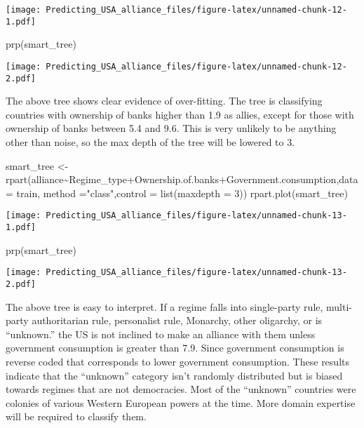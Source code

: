 \documentclass[
]{article}
\newenvironment{Shaded}{\begin{snugshade}}{\end{snugshade}}
\newcommand{\AttributeTok}[1]{\textcolor[rgb]{0.77,0.63,0.00}{#1}}
\newcommand{\DecValTok}[1]{\textcolor[rgb]{0.00,0.00,0.81}{#1}}
\newcommand{\FunctionTok}[1]{\textcolor[rgb]{0.00,0.00,0.00}{#1}}
\newcommand{\NormalTok}[1]{#1}
\newcommand{\OtherTok}[1]{\textcolor[rgb]{0.56,0.35,0.01}{#1}}
\newcommand{\SpecialCharTok}[1]{\textcolor[rgb]{0.00,0.00,0.00}{#1}}
\newcommand{\StringTok}[1]{\textcolor[rgb]{0.31,0.60,0.02}{#1}}
\begin{document}
\texttt{[image: Predicting\_USA\_alliance\_files/figure-latex/unnamed-chunk-12-1.pdf]}

\begin{Shaded}
\begin{Highlighting}[]
\FunctionTok{prp}\NormalTok{(smart\_tree)}
\end{Highlighting}
\end{Shaded}

\texttt{[image: Predicting\_USA\_alliance\_files/figure-latex/unnamed-chunk-12-2.pdf]}

The above tree shows clear evidence of over-fitting. The tree is
classifying countries with ownership of banks higher than 1.9 as allies,
except for those with ownership of banks between 5.4 and 9.6. This is
very unlikely to be anything other than noise, so the max depth of the
tree will be lowered to 3.

\begin{Shaded}
\begin{Highlighting}[]
\NormalTok{smart\_tree }\OtherTok{\textless{}{-}} \FunctionTok{rpart}\NormalTok{(alliance}\SpecialCharTok{\textasciitilde{}}\NormalTok{Regime\_type}\SpecialCharTok{+}\NormalTok{Ownership.of.banks}\SpecialCharTok{+}\NormalTok{Government.consumption,}\AttributeTok{data =}\NormalTok{ train, }\AttributeTok{method =}\StringTok{"class"}\NormalTok{,}\AttributeTok{control =} \FunctionTok{list}\NormalTok{(}\AttributeTok{maxdepth =} \DecValTok{3}\NormalTok{))}
\FunctionTok{rpart.plot}\NormalTok{(smart\_tree)}
\end{Highlighting}
\end{Shaded}

\texttt{[image: Predicting\_USA\_alliance\_files/figure-latex/unnamed-chunk-13-1.pdf]}

\begin{Shaded}
\begin{Highlighting}[]
\FunctionTok{prp}\NormalTok{(smart\_tree)}
\end{Highlighting}
\end{Shaded}

\texttt{[image: Predicting\_USA\_alliance\_files/figure-latex/unnamed-chunk-13-2.pdf]}

The above tree is easy to interpret. If a regime falls into single-party
rule, multi-party authoritarian rule, personalist rule, Monarchy, other
oligarchy, or is ``unknown.'' the US is not inclined to make an alliance
with them unless government consumption is greater than 7.9. Since
government consumption is reverse coded that corresponds to lower
government consumption. These results indicate that the ``unknown''
category isn't randomly distributed but is biased towards regimes that
are not democracies. Most of the ``unknown'' countries were colonies of
various Western European powers at the time. More domain expertise will
be required to classify them.
\end{document}
